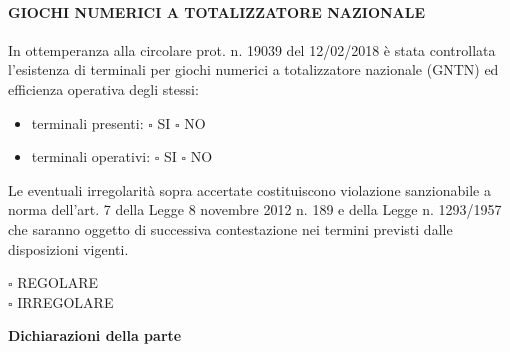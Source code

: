 \documentclass[12pt]{article}
\begin{document}
\paragraph{GIOCHI NUMERICI A TOTALIZZATORE NAZIONALE}
In ottemperanza alla circolare prot. n. 19039 del 12/02/2018 è stata controllata l’esistenza di terminali per giochi numerici a totalizzatore nazionale (GNTN) ed efficienza operativa degli stessi:
\begin{multicols}{2}
    \begin{itemize}
        \item terminali presenti: \begin{math}\square\end{math} SI \begin{math}\square\end{math} NO
        \item terminali operativi: \begin{math}\square\end{math} SI \begin{math}\square\end{math} NO
    \end{itemize}
\end{multicols}

Le eventuali irregolarità sopra accertate costituiscono violazione sanzionabile a norma dell’art. 7 della Legge 8 novembre 2012 n. 189 e della Legge n. 1293/1957 che saranno oggetto di successiva contestazione nei termini previsti dalle disposizioni vigenti.
\begin{multicols}{2}
    \begin{math}\square\end{math} REGOLARE \\
    \begin{math}\square\end{math} IRREGOLARE
\end{multicols}








\begin{center}
    \textbf{Dichiarazioni della parte}
\end{center}
\end{document}
